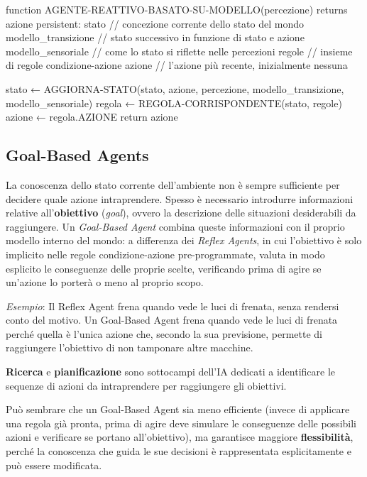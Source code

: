 \documentclass[a4paper, 11pt, oneside]{book}
\theoremstyle{definition}
\begin{document}
\begin{codice}
function AGENTE-REATTIVO-BASATO-SU-MODELLO(percezione) returns azione
    persistent:
        stato               // concezione corrente dello stato del mondo
        modello_transizione // stato successivo in funzione di stato e azione
        modello_sensoriale  // come lo stato si riflette nelle percezioni
        regole              // insieme di regole condizione-azione
        azione              // l'azione più recente, inizialmente nessuna

    stato ← AGGIORNA-STATO(stato, azione, percezione,
                           modello_transizione, modello_sensoriale)
    regola ← REGOLA-CORRISPONDENTE(stato, regole)
    azione ← regola.AZIONE
    return azione
\end{codice}

	\subsection{Goal-Based Agents}
	La conoscenza dello stato corrente dell'ambiente non \`e sempre sufficiente per
	decidere quale azione intraprendere. Spesso \`e necessario introdurre informazioni
	relative all'\textbf{obiettivo} (\textit{goal}), ovvero la descrizione delle
	situazioni desiderabili da raggiungere. Un \textit{Goal-Based Agent} combina
	queste informazioni con il proprio modello interno del mondo: a differenza dei
	\textit{Reflex Agents}, in cui l'obiettivo \`e solo implicito nelle regole
	condizione-azione pre-programmate, valuta in modo esplicito le conseguenze delle
	proprie scelte, verificando prima di agire se un'azione lo porter\`a o meno al proprio
	scopo.

	\emph{Esempio}: Il Reflex Agent frena quando vede le luci di frenata, senza
	rendersi conto del motivo. Un Goal-Based Agent frena quando vede le luci
	di frenata perch\'e quella \`e l'unica azione che, secondo la sua previsione,
	permette di raggiungere l'obiettivo di non tamponare altre macchine.

	\textbf{Ricerca} e \textbf{pianificazione} sono sottocampi dell'IA dedicati a
	identificare le sequenze di azioni da intraprendere per raggiungere gli
	obiettivi.

	Pu\`o sembrare che un Goal-Based Agent sia meno efficiente (invece di applicare
	una regola gi\`a pronta, prima di agire deve simulare le conseguenze delle possibili
	azioni e verificare se portano all'obiettivo), ma garantisce maggiore \textbf{flessibilit\`a},
	perch\'e la conoscenza che guida le sue decisioni \`e rappresentata
	esplicitamente e pu\`o essere modificata.
\end{document}

